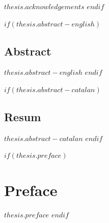 \vspace*{\baselineskip}

\normalsize{$thesis.acknowledgements$}
\afterpage{\blankpage}
$endif$


$if(thesis.abstract-english)$
\section*{\sffamily Abstract}

\vspace*{\baselineskip}

\normalsize{$thesis.abstract-english$}
\vspace*{\baselineskip}
$endif$


$if(thesis.abstract-catalan)$
\section*{\sffamily Resum}

\vspace*{\baselineskip}

\normalsize{$thesis.abstract-catalan$}
\afterpage{\blankpage}
$endif$


$if(thesis.preface)$
\chapter*{\sffamily Preface}

\vspace*{\baselineskip}

\normalsize{$thesis.preface$}
\afterpage{\blankpage}
$endif$

